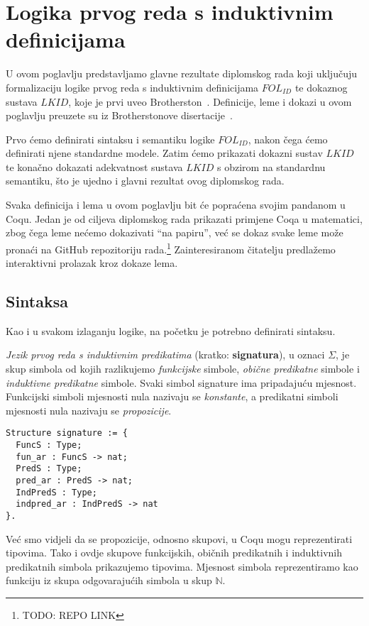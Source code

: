 \chapter{Logika prvog reda s induktivnim definicijama}\label{cha:logika-prvog-reda}
U ovom poglavlju predstavljamo glavne rezultate diplomskog rada koji uključuju formalizaciju
logike prvog reda s induktivnim definicijama \(\mathit{FOL_{ID}}\)
te dokaznog sustava \(\mathit{LKID}\), koje je prvi uveo Brotherston~\cite{brotherston2005}.
Definicije, leme i dokazi u ovom poglavlju preuzete su iz Brotherstonove disertacije~\cite{brotherstonphd}.

Prvo ćemo definirati sintaksu i semantiku logike \(\mathit{FOL_{ID}}\),
nakon čega ćemo definirati njene standardne modele.
Zatim ćemo prikazati dokazni sustav \(\mathit{LKID}\) te konačno dokazati adekvatnost
sustava \(LKID\) s obzirom na standardnu semantiku,
što je ujedno i glavni rezultat ovog diplomskog rada.

Svaka definicija i lema u ovom poglavlju bit će popraćena svojim pandanom u Coqu.
Jedan je od ciljeva diplomskog rada prikazati primjene Coqa u matematici,
zbog čega leme nećemo dokazivati \enquote{na papiru},
već se dokaz svake leme može pronaći na GitHub repozitoriju rada.\footnote{TODO: REPO LINK}
Zainteresiranom čitatelju predlažemo interaktivni prolazak kroz dokaze lema.

\section{Sintaksa}\label{sec:sintaksa}
Kao i u svakom izlaganju logike, na početku je potrebno definirati sintaksu.
\begin{definition}\label{def:signatura}
  \textit{Jezik prvog reda s induktivnim predikatima} (kratko: \textbf{signatura}), u oznaci \(\Sigma\),
  je skup simbola od kojih razlikujemo \textit{funkcijske} simbole, \textit{obične predikatne} simbole
  i \textit{induktivne predikatne} simbole.
  Svaki simbol signature ima pripadajuću mjesnost.
  Funkcijski simboli mjesnosti nula nazivaju se \textit{konstante},
  a predikatni simboli mjesnosti nula nazivaju se \textit{propozicije}.
  \begin{verbatim}
Structure signature := {
  FuncS : Type;
  fun_ar : FuncS -> nat;
  PredS : Type;
  pred_ar : PredS -> nat;
  IndPredS : Type;
  indpred_ar : IndPredS -> nat
}.
  \end{verbatim}
\end{definition}

\noindent Već smo vidjeli da se propozicije, odnosno skupovi, u Coqu mogu reprezentirati tipovima.
Tako i ovdje skupove funkcijskih, običnih predikatnih i induktivnih predikatnih simbola prikazujemo tipovima.
Mjesnost simbola reprezentiramo kao funkciju iz skupa odgovarajućih simbola u skup \(\mathbb{N}\).

